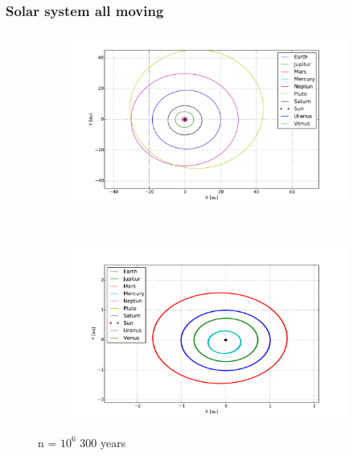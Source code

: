 \subsubsection{Solar system all moving}

\begin{figure}[H]
    \centering
    \begin{subfigure}{0.5\textwidth}
        \centering
        \includegraphics[width=\linewidth]{result/bilder/all-moving-solarsystem.pdf}
        \caption{}
    \end{subfigure}%
    ~ 
    \begin{subfigure}{0.5\textwidth}
        \centering
        \includegraphics[width=\linewidth]{result/bilder/all-moving-solarsystem-zoom.pdf}
        \caption{}
    \end{subfigure}
    \caption{n = $10^6$ 300 years}
    \label{fig:three-body-varying}
\end{figure}












